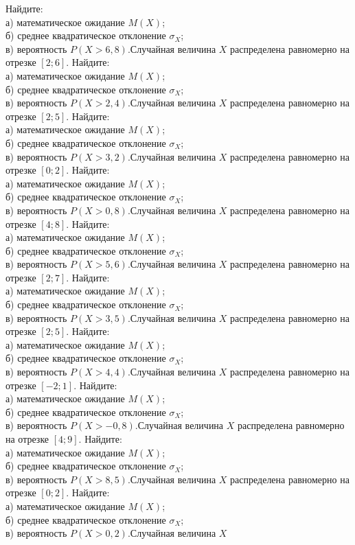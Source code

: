 Найдите: \\ \quad а) математическое ожидание $M(X)$; \\ \quad б) среднее квадратическое отклонение $\sigma_X$; \\ \quad в) вероятность $P(X>6{,}8)$.Случайная величина $X$ распределена равномерно на отрезке $[2; 6]$. Найдите: \\ \quad а) математическое ожидание $M(X)$; \\ \quad б) среднее квадратическое отклонение $\sigma_X$; \\ \quad в) вероятность $P(X>2{,}4)$.Случайная величина $X$ распределена равномерно на отрезке $[2; 5]$. Найдите: \\ \quad а) математическое ожидание $M(X)$; \\ \quad б) среднее квадратическое отклонение $\sigma_X$; \\ \quad в) вероятность $P(X>3{,}2)$.Случайная величина $X$ распределена равномерно на отрезке $[0; 2]$. Найдите: \\ \quad а) математическое ожидание $M(X)$; \\ \quad б) среднее квадратическое отклонение $\sigma_X$; \\ \quad в) вероятность $P(X>0{,}8)$.Случайная величина $X$ распределена равномерно на отрезке $[4; 8]$. Найдите: \\ \quad а) математическое ожидание $M(X)$; \\ \quad б) среднее квадратическое отклонение $\sigma_X$; \\ \quad в) вероятность $P(X>5{,}6)$.Случайная величина $X$ распределена равномерно на отрезке $[2; 7]$. Найдите: \\ \quad а) математическое ожидание $M(X)$; \\ \quad б) среднее квадратическое отклонение $\sigma_X$; \\ \quad в) вероятность $P(X>3{,}5)$.Случайная величина $X$ распределена равномерно на отрезке $[2; 5]$. Найдите: \\ \quad а) математическое ожидание $M(X)$; \\ \quad б) среднее квадратическое отклонение $\sigma_X$; \\ \quad в) вероятность $P(X>4{,}4)$.Случайная величина $X$ распределена равномерно на отрезке $[-2; 1]$. Найдите: \\ \quad а) математическое ожидание $M(X)$; \\ \quad б) среднее квадратическое отклонение $\sigma_X$; \\ \quad в) вероятность $P(X>-0{,}8)$.Случайная величина $X$ распределена равномерно на отрезке $[4; 9]$. Найдите: \\ \quad а) математическое ожидание $M(X)$; \\ \quad б) среднее квадратическое отклонение $\sigma_X$; \\ \quad в) вероятность $P(X>8{,}5)$.Случайная величина $X$ распределена равномерно на отрезке $[0; 2]$. Найдите: \\ \quad а) математическое ожидание $M(X)$; \\ \quad б) среднее квадратическое отклонение $\sigma_X$; \\ \quad в) вероятность $P(X>0{,}2)$.Случайная величина $X$ 